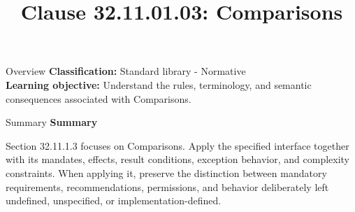 \documentclass[10pt,letterpaper]{article}
\title{Clause 32.11.01.03: Comparisons}
\author{}
\date{}
\begin{document}
\maketitle
\begin{CornellOverviewBox}{Overview}
\textbf{Classification:} Standard library - Normative\\[2pt]
\textbf{Learning objective:} Understand the rules, terminology, and semantic consequences associated with Comparisons.
\end{CornellOverviewBox}\begin{CornellSummaryBox}{Summary}
{\sffamily\bfseries\color{Accent} Summary}\par\vspace{3pt}Section 32.11.1.3 focuses on Comparisons. Apply the specified interface together with its mandates, effects, result conditions, exception behavior, and complexity constraints. When applying it, preserve the distinction between mandatory requirements, recommendations, permissions, and behavior deliberately left undefined, unspecified, or implementation-defined.
\end{CornellSummaryBox}
\end{document}
